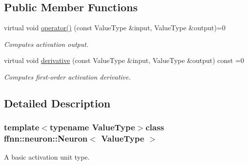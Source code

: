 \subsection*{Public Member Functions}
\begin{DoxyCompactItemize}
\item 
virtual void \hyperlink{classffnn_1_1neuron_1_1_neuron_ae215373ce29e135cb5fd728964772a32}{operator()} (const Value\-Type \&input, Value\-Type \&output)=0
\begin{DoxyCompactList}\small\item\em Computes activation output. \end{DoxyCompactList}\item 
virtual void \hyperlink{classffnn_1_1neuron_1_1_neuron_ac779b179887e6b4505dec96d0319af10}{derivative} (const Value\-Type \&input, Value\-Type \&output) const =0
\begin{DoxyCompactList}\small\item\em Computes first-\/order activation derivative. \end{DoxyCompactList}\end{DoxyCompactItemize}


\subsection{Detailed Description}
\subsubsection*{template$<$typename Value\-Type$>$class ffnn\-::neuron\-::\-Neuron$<$ Value\-Type $>$}

A basic activation unit type. 

